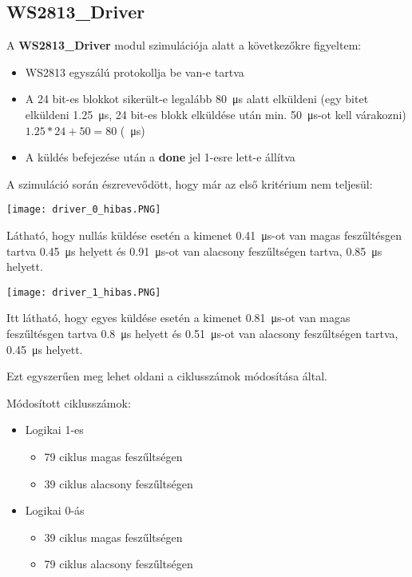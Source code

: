 \subsection{WS2813\_Driver}

A \textbf{WS2813\_Driver} modul szimulációja alatt a következőkre figyeltem:
\begin{itemize}
	\item WS2813 egyszálú protokollja be van-e tartva
	\item A 24 bit-es blokkot sikerült-e legalább \SI{80}{\micro\second} alatt elküldeni (egy bitet elküldeni \SI{1.25}{\micro\second}, 24 bit-es blokk elküldése után min. \SI{50}{\micro\second}-ot kell várakozni) $1.25 * 24 + 50 = 80$ (\SI{}{\micro\second})
	\item A küldés befejezése után a \textbf{done} jel 1-esre lett-e állítva
\end{itemize}

\tab A szimuláció során észrevevődött, hogy már az első kritérium nem teljesül:

\texttt{[image: driver\_0\_hibas.PNG]}

\tab Látható, hogy nullás küldése esetén a kimenet \SI{0.41}{\micro\second}-ot van magas feszűltésgen tartva \SI{0.45}{\micro\second} helyett és \SI{0.91}{\micro\second}-ot van
alacsony feszűltségen tartva, \SI{0.85}{\micro\second} helyett.

\texttt{[image: driver\_1\_hibas.PNG]}

\tab Itt látható, hogy egyes küldése esetén a kimenet \SI{0.81}{\micro\second}-ot van magas feszűltésgen tartva \SI{0.8}{\micro\second} helyett és \SI{0.51}{\micro\second}-ot van
alacsony feszűltségen tartva, \SI{0.45}{\micro\second} helyett.

Ezt egyszerűen meg lehet oldani a ciklusszámok módosítása által.

Módosított ciklusszámok:

\begin{itemize}
\item Logikai 1-es
	\begin{itemize}
	\item 79 ciklus magas feszűltségen
	\item 39 ciklus alacsony feszűltségen
	\end{itemize}
\item Logikai 0-ás
	\begin{itemize}
	\item 39 ciklus magas feszűltségen
	\item 79 ciklus alacsony feszűltségen
	\end{itemize}
\end{itemize}

